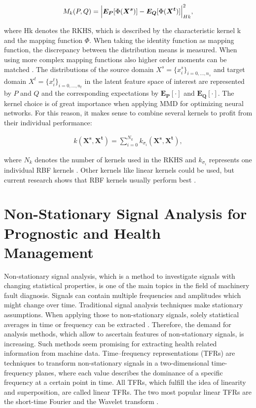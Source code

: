 \begin{align}
    M_{k}(P,Q) = \Bigl|  \boldsymbol{E_{P}}[\Phi(\boldsymbol{X^{s}})] - \boldsymbol{E_{Q}}[\Phi(\boldsymbol{X^{t}})]     \Bigl|^{2}_{Hk},
\end{align}

where Hk denotes the RKHS, which is described by the characteristic kernel k and the mapping function $\Phi$. When taking the identity function as mapping function, the discrepancy between the distribution means is measured. When using more complex mapping functions also higher order moments can be matched \cite{Yujia2015}. The distributions of the source domain $X^{s} = \{{x}_{i}^{s}\}_{i=0,...,n_{s}}$ and target domain $X^{t} = \{{x}_{i}^{t}\}_{i=0,...,n_{t}}$ in the latent feature space of interest are represented by $P$ and $Q$ and the corresponding expectations by $\boldsymbol{E_{P}[\cdot]}$ and $\boldsymbol{E_{Q}[\cdot]}$. The kernel choice is of great importance when applying MMD for optimizing neural networks. For this reason, it makes sense to combine several kernels to profit from their individual performance:

\begin{align}
    k(\boldsymbol{X^{s}}, \boldsymbol{X^{t}}) = \sum_{i=0}^{N_{k}} k_{\sigma_{i}}(\boldsymbol{X^{s}}, \boldsymbol{X^{t}}),
\end{align}

where $N_{k}$ denotes the number of kernels used in the RKHS and $k_{\sigma_{i}}$ represents one individual RBF kernels  \cite{li2020}. Other kernels like linear kernels could be used, but current research shows that RBF kernels usually perform best \cite{AZAMFAR2020103932}.


\section{Non-Stationary Signal Analysis for Prognostic and Health Management}
Non-stationary signal analysis, which is a method to investigate signals with changing statistical properties, is one of the main topics in the field of machinery fault diagnosis. Signals can contain multiple frequencies and amplitudes which might change over time. Traditional signal analysis techniques make stationary assumptions. When applying those to non-stationary signals, solely statistical averages in time or frequency can be extracted \cite{FENG2013}. Therefore, the demand for analysis methods, which allow to ascertain features of non-stationary signals, is increasing. Such methods seem promising for extracting health related information from machine data. Time–frequency representations (TFRs) are techniques to transform non-stationary signals in a two-dimensional time-frequency planes, where each value describes the dominance of a specific frequency at a certain point in time. All TFRs, which fulfill the idea of linearity and superposition, are called linear TFRs. The two most popular linear TFRs are the short-time Fourier and the Wavelet transform \cite{Hlawatsch1992}. 


